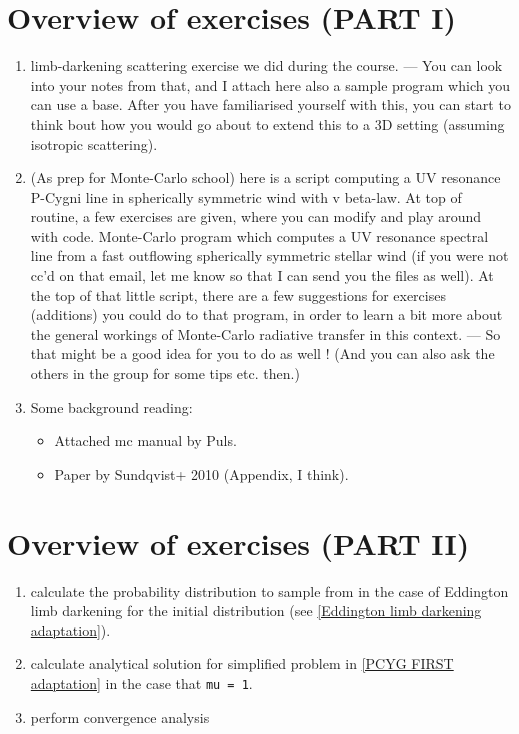 \documentclass[../main/main.tex]{subfiles}
\begin{document}
\section{Overview of exercises (PART I)}

\begin{enumerate}
\item limb-darkening scattering exercise we did during the course. 
— You can look into your notes from that, and I attach here also a sample program which you can use a base. After you have familiarised yourself with this, you can start to think bout how you would go about to extend this to a 3D setting (assuming isotropic scattering). 

\item (As prep for Monte-Carlo school) here is a script computing a UV resonance P-Cygni line in spherically symmetric wind with v beta-law. At top of routine, a few exercises are given, where you can modify and play around with code. Monte-Carlo program which computes a UV resonance spectral line from a fast outflowing spherically symmetric stellar wind (if you were not cc’d on that email, let me know so that I can send you the files as well). At the top of that little script, there are a few suggestions for exercises (additions) you could do to that program, in order to learn a bit more about the general workings of Monte-Carlo radiative transfer in this context.  
— So that might be a good idea for you to do as well !   (And you can also ask the others in the group for some tips etc. then.) 

\item Some background reading: 
\begin{itemize}
\item Attached mc manual by Puls. 
\item Paper by Sundqvist+ 2010 (Appendix, I think). 
\end{itemize}
\end{enumerate}


\section{Overview of exercises (PART II)}
\begin{enumerate}
\item calculate the probability distribution to sample from in the case of Eddington limb darkening for the initial distribution (see \ref{Eddington limb darkening adaptation}).
\item calculate analytical solution for simplified problem in \ref{PCYG FIRST adaptation} in the case that \texttt{mu = 1}.
\item perform convergence analysis
\end{enumerate}
\end{document}
